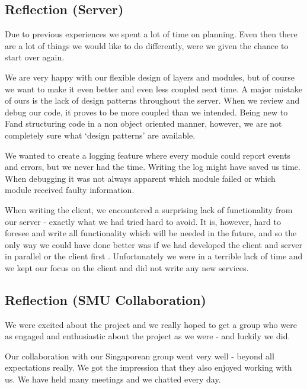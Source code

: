 \subsection{Reflection (Server)}
Due to previous experiences we spent a lot of time on planning. Even then there are a lot of things we would like to do differently, were we given the chance to start over again.

We are very happy with our flexible design of layers and modules, but of course we want to make it even better and even less coupled next time. A major mistake of ours is the lack of design patterns throughout the server. When we review and debug our code, it proves to be more coupled than we intended. Being new to F\Sh and structuring code in a non object oriented manner, however, we are not completely sure what `design patterns' are available.

We wanted to create a logging feature where every module could report events and errors, but we never had the time. Writing the log might have saved us time. When debugging it was not always apparent which module failed or which module received faulty information. 

When writing the client, we encountered a surprising lack of functionality from our server - exactly what we had tried hard to avoid. It is, however, hard to foresee and write all functionality which will be needed in the future, and so the only way we could have done better was if we had developed the client and server in parallel or the client first .
Unfortunately we were in a terrible lack of time and we kept our focus on the client and did not write any new services.

\subsection{Reflection (SMU Collaboration)}
We were excited about the project and we really hoped to get a group who were as engaged and enthusiastic about the project as we were - and luckily we did.

Our collaboration with our Singaporean group went very well - beyond all expectations really. We got the impression that they also enjoyed working with us. We have held many meetings and we chatted every day.

\newpage